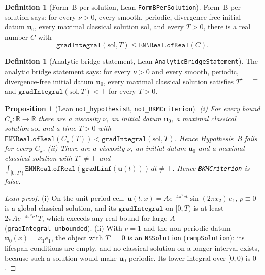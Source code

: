 \documentclass[11pt,reqno]{amsart}
\newtheorem{proposition}[theorem]{Proposition}
\theoremstyle{definition}
\newtheorem{definition}[theorem]{Definition}
\newcommand{\R}{\mathbb{R}}
\newcommand{\uvec}{\mathbf{u}}
\numberwithin{equation}{section}
\begin{document}
\begin{definition}[Form~B per solution, Lean \texttt{FormBPerSolution}]\label{def:formB}
Form~B per solution says: for every \(\nu>0\), every smooth, periodic, divergence-free initial datum \(\uvec_0\), every maximal classical solution \(\mathrm{sol}\), and every \(T>0\), there is a real number \(C\) with
\[
\texttt{gradIntegral}(\mathrm{sol},T)\le \texttt{ENNReal.ofReal}(C).
\]
\end{definition}

\begin{definition}[Analytic bridge statement, Lean \texttt{AnalyticBridgeStatement}]\label{def:bridge}
The analytic bridge statement says: for every \(\nu>0\) and every smooth, periodic, divergence-free initial datum \(\uvec_0\), every maximal classical solution satisfies \(T^\star=\top\) and \(\texttt{gradIntegral}(\mathrm{sol},T)<\top\) for every \(T>0\).
\end{definition}

\begin{proposition}[Lean \texttt{not\_hypothesisB}, \texttt{not\_BKMCriterion}]\label{prop:false}
(i) For every bound \(C_\star:\R\to\R\) there are a viscosity \(\nu\), an initial datum \(\uvec_0\), a maximal classical solution \(\mathrm{sol}\) and a time \(T>0\) with \(\texttt{ENNReal.ofReal}(C_\star(T))<\texttt{gradIntegral}(\mathrm{sol},T)\). Hence Hypothesis~B fails for every \(C_\star\).
(ii) There are a viscosity \(\nu\), an initial datum \(\uvec_0\) and a maximal classical solution with \(T^\star\neq\top\) and \(\int_{[0,T^\star)}^\texttt{-}\texttt{ENNReal.ofReal}(\texttt{gradLinf}(\uvec(t)))\,dt\neq\top\). Hence \texttt{BKMCriterion} is false.
\end{proposition}

\begin{proof}[Lean proof]
(i) On the unit-period cell, \(\uvec(t,x)=A e^{-4\pi^2\nu t}\sin(2\pi x_2)\,e_1\), \(p\equiv 0\) is a global classical solution, and its \(\texttt{gradIntegral}\) on \([0,T)\) is at least \(2\pi A e^{-4\pi^2\nu T}T\), which exceeds any real bound for large \(A\) (\texttt{gradIntegral\_unbounded}). (ii) With \(\nu=1\) and the non-periodic datum \(\uvec_0(x)=x_1e_1\), the object with \(T^\star=0\) is an \texttt{NSSolution} (\texttt{rampSolution}): its lifespan conditions are empty, and no classical solution on a longer interval exists, because such a solution would make \(\uvec_0\) periodic. Its lower integral over \([0,0)\) is \(0\).
\end{proof}
\end{document}
